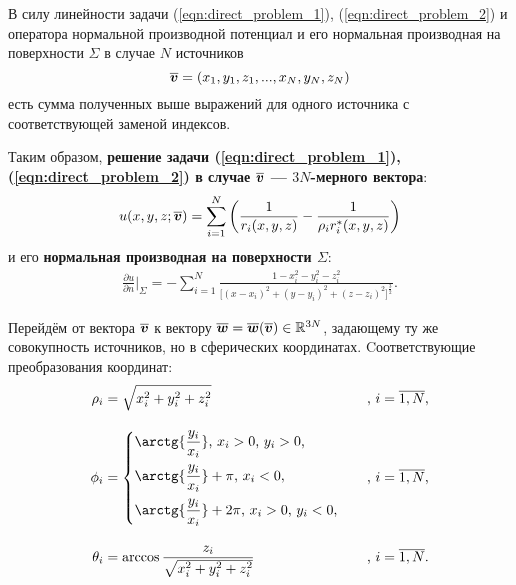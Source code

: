 В силу линейности задачи (\ref{eqn:direct_problem_1}), (\ref{eqn:direct_problem_2}) и оператора нормальной производной потенциал и его нормальная производная на поверхности $\Sigma$ в случае $N$ источников
\[
\boldsymbol{\overline{v}}=(x_1,y_1,z_1,...,x_N,y_N,z_N)
\]
есть сумма полученных выше выражений для одного источника с соответствующей заменой индексов.

Таким образом, \textbf{решение задачи (\ref{eqn:direct_problem_1}), (\ref{eqn:direct_problem_2}) в случае $\boldsymbol{\overline{v}}$ --- $3N$-мерного вектора}:
\begin{equation}
	u(x,y,z; \boldsymbol{\overline{v}}) =
	\sum\limits_{i = 1}^{N}
	\bigg(
	\frac{1}{r_i(x,y,z)} -
	\frac{1}{\rho_i r_i^*(x,y,z)}
	\bigg)
	\label{eqn:potential}
\end{equation}
и его \textbf{нормальная производная на поверхности $\Sigma$}:
\begin{equation}
	\begin{split}
		\frac{\partial u}{\partial n}
		\Big|_\Sigma
		=
		-
		\sum\limits_{i = 1}^{N}
		\frac{1 - x_i^2 - y_i^2 - z_i^2}
		{
			\big[
			(x - x_i)^2 + (y - y_i)^2 + (z - z_i)^2
			\big]^{\tfrac{3}{2}}}
		\text{.}\label{eqn:normal_derivative}
	\end{split}
\end{equation}

Перейдём от вектора $\boldsymbol{\overline{v}}$ к вектору $\boldsymbol{\overline{w}}=\boldsymbol{\overline{w}}(\boldsymbol{\overline{v}}) \in \mathbb{R}^{3N}$, задающему ту же совокупность источников, но в сферических координатах. Cоответствующие преобразования координат:
\begin{equation}
	\begin{aligned}
		\rho_i
		&= 
		\sqrt{
			x_i^2 + y_i^2 + z_i^2
		}
		&\text{, }
		i=\overline{1,N}
		\text{,}
		\\[10pt]
		\phi_i
		&=
		\begin{cases}
			\begin{aligned}
				&\arctg{\frac{y_i}{x_i}}\text{, } x_i > 0\text{, } y_i > 0 \text{,}\\[5pt]
				&\arctg{\frac{y_i}{x_i}} + \pi \text{, } x_i < 0 \text{,}\\[5pt]
				&\arctg{\frac{y_i}{x_i}} + 2 \pi\text{, } x_i > 0\text{, } y_i < 0 \text{,}\\
			\end{aligned}
		\end{cases}
		&\text{, }
		i=\overline{1,N}
		\text{,}
		\\[10pt]
		\theta_i
		&=
		\arccos{
			\frac{z_i}
			{
				\sqrt{x_i^2 + y_i^2 + z_i^2}
		}}
		&\text{, }
		i=\overline{1,N}
		\text{.}
	\end{aligned}
\end{equation}


